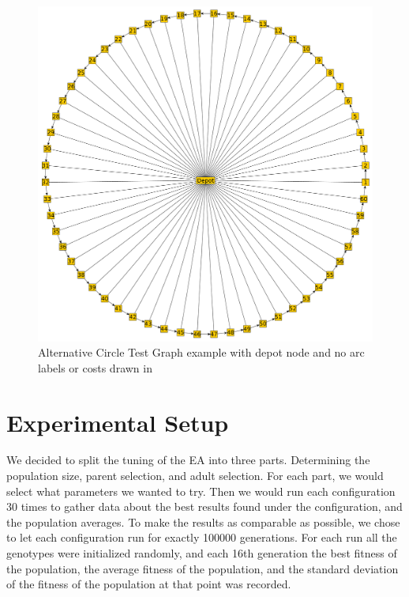 \begin{figure}[thbp]
	\centerline{\includegraphics[width=\textwidth]{figures/CircleTests/CircleTestIllustrations/Circle_Test_Graph_Central_Depot-No_arc_or_edge_labels_or_costs.pdf}}
	\caption{Alternative Circle Test Graph example with depot node and no arc labels or costs drawn in}
	\label{fig:ctgcdnaoeloc}
\end{figure}



\section{Experimental Setup} %
\label{sec:experimental_setup}
We decided to split the tuning of the EA into three parts. Determining the population size, parent selection, and adult selection. For each part, we would select what parameters we wanted to try. Then we would run each configuration 30 times to gather data about the best results found under the configuration, and the population averages. To make the results as comparable as possible, we chose to let each configuration run for exactly 100000 generations. For each run all the genotypes were initialized randomly, and each 16th generation the best fitness of the population, the average fitness of the population, and the standard deviation of the fitness of the population at that point was recorded.

